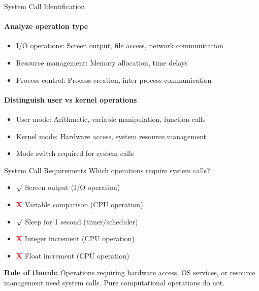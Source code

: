 \begin{KR}{System Call Identification}
    \paragraph{Analyze operation type}
    \begin{itemize}
        \item I/O operations: Screen output, file access, network communication
        \item Resource management: Memory allocation, time delays
        \item Process control: Process creation, inter-process communication
    \end{itemize}
    
    \paragraph{Distinguish user vs kernel operations}
    \begin{itemize}
        \item User mode: Arithmetic, variable manipulation, function calls
        \item Kernel mode: Hardware access, system resource management
        \item Mode switch required for system calls
    \end{itemize}
\end{KR}

\begin{example2}{System Call Requirements}
    Which operations require system calls?
    
    \begin{itemize}
        \item \textcolor{frog}{$\surd$} Screen output (I/O operation)
        \item \textcolor{red}{\textbf{X}} Variable comparison (CPU operation)
        \item \textcolor{frog}{$\surd$} Sleep for 1 second (timer/scheduler)
        \item \textcolor{red}{\textbf{X}} Integer increment (CPU operation)
        \item \textcolor{red}{\textbf{X}} Float increment (CPU operation)
    \end{itemize}
    
    \tcblower
    
    \textbf{Rule of thumb:}
    Operations requiring hardware access, OS services, or resource management need system calls. Pure computational operations do not.
\end{example2}

